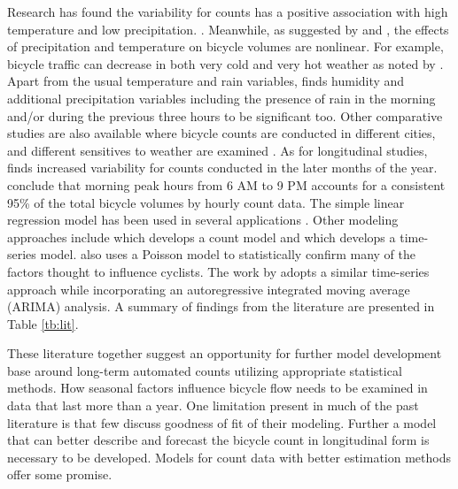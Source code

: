 \documentclass[12pt,letterpaper,article]{memoir}
\begin{document}
Research has found the variability for counts has a positive
association with high temperature and low precipitation. \parencite{Niemeier:1996aa,Parkin:2008aa}. Meanwhile, as suggested by
\textcite{Lewin:2011aa} and \textcite{Thomas:2009aa}, the effects of
precipitation and temperature on bicycle volumes are nonlinear. For
example, bicycle traffic can decrease in both very cold and very hot
weather as noted by \textcite{Richardson:2000aa}. Apart from the usual
temperature and rain variables, \textcite{Miranda-Moreno:2011aa} finds
humidity and additional precipitation variables including the presence
of rain in the morning and/or during the previous three hours to be
significant too. Other comparative studies are also available where
bicycle counts are conducted in different cities, and different
sensitives to weather are examined \parencite{Rose:2011aa}. As for
longitudinal studies, \textcite{Niemeier:1996aa} finds increased variability
for counts conducted in the later months of the year.
\textcite{Jones:2010aa} conclude that morning peak hours from 6 AM to 9 PM
accounts for a consistent 95\% of the total bicycle volumes by hourly
count data. The simple linear regression model has been used in
several applications \parencite{Jones:2008aa,Jones:2010aa}. Other modeling approaches include \textcite{Miranda-Moreno:2011aa} which develops a count
model and \textcite{Thomas:2009aa} which develops a time-series model.
\textcite{Niemeier:1996aa} also uses a Poisson model to statistically
confirm  many of the factors thought to influence cyclists. The
work by \textcite{Gallop:2012aa} adopts a similar time-series approach
while incorporating an autoregressive integrated moving average
(ARIMA) analysis. A summary of findings from the literature are
presented in Table \ref{tb:lit}.

These literature together suggest an opportunity for further model
development base around long-term automated counts utilizing
appropriate statistical methods. How seasonal factors influence
bicycle flow needs to be examined in data that last more than a year.
One limitation present in much of the past literature is that few
discuss goodness of fit of their modeling. Further a model that can
better describe and forecast the bicycle count in longitudinal form is
necessary to be developed. Models for count data with better
estimation methods offer some promise.
\end{document}
